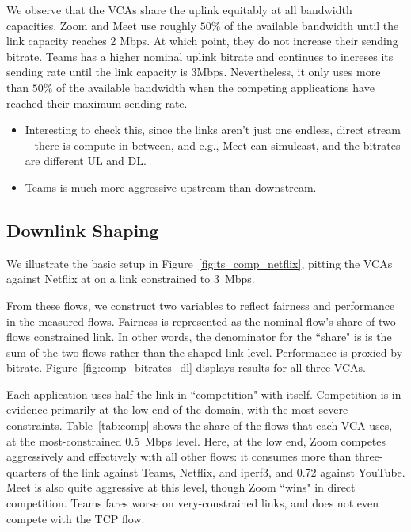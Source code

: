 We observe that the VCAs share the uplink equitably at all bandwidth capacities. Zoom and Meet use roughly $50\%$ of the available bandwidth until the link capacity reaches 2 Mbps. At which point, they do not increase their sending bitrate. Teams has a higher nominal uplink bitrate and continues to increses its sending rate until the link capacity is 3Mbps. Nevertheless, it only uses more than $50\%$ of the available bandwidth when the competing applications have reached their maximum sending rate. 

\begin{itemize}
    \item Interesting to check this, since the links aren't just one endless, direct stream -- there is compute in between, and e.g., Meet can simulcast, and the bitrates are different UL and DL.
    \item Teams is much more aggressive upstream than downstream.
\end{itemize}




\subsection{Downlink Shaping}

We illustrate the basic setup in Figure~\ref{fig:ts_comp_netflix}, 
  pitting the VCAs against Netflix at on a link constrained to 3~Mbps.

From these flows, we construct two variables
  to reflect fairness and performance in the measured flows.
Fairness is represented 
  as the nominal flow's share of two flows constrained link.
In other words, the denominator for the ``share" is
  is the sum of the two flows rather than 
  the shaped link level.
Performance is proxied by bitrate.
Figure~\ref{fig:comp_bitrates_dl}
  displays results for all three VCAs.


Each application uses half the link in ``competition" with itself.
Competition is in evidence primarily at the low end of the domain,
  with the most severe constraints.
Table~\ref{tab:comp} shows the share
  of the flows that each VCA uses,
  at the most-constrained 0.5~Mbps level.
Here, at the low end, Zoom competes
  aggressively and effectively with all other flows:
  it consumes more than three-quarters of the link against Teams, Netflix, and iperf3, 
  and 0.72 against YouTube.
Meet is also quite aggressive at this level, 
  though Zoom ``wins" in direct competition.
Teams fares worse on very-constrained links,
  and does not even compete with the TCP flow.
  


